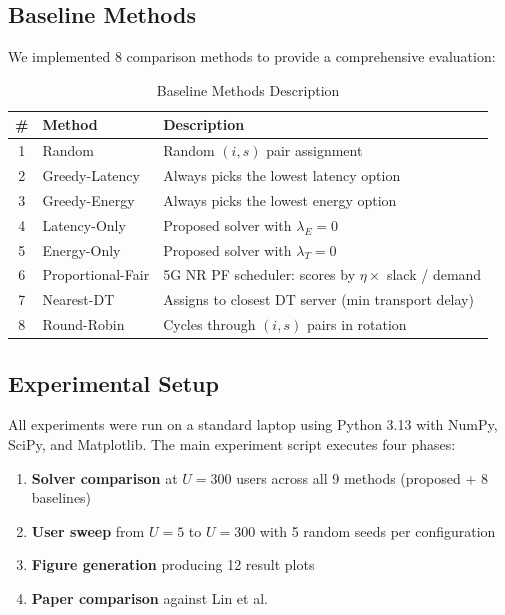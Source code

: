 \documentclass[12pt]{article}
\begin{document}
\subsection{Baseline Methods}

We implemented 8 comparison methods to provide a comprehensive evaluation:

\begin{table}[H]
\centering
\caption{Baseline Methods Description}
\label{tab:baselines}
\begin{tabular}{clp{8cm}}
\toprule
\textbf{\#} & \textbf{Method} & \textbf{Description} \\
\midrule
1 & Random           & Random $(i, s)$ pair assignment \\
2 & Greedy-Latency   & Always picks the lowest latency option \\
3 & Greedy-Energy    & Always picks the lowest energy option \\
4 & Latency-Only     & Proposed solver with $\lambda_E = 0$ \\
5 & Energy-Only      & Proposed solver with $\lambda_T = 0$ \\
6 & Proportional-Fair & 5G NR PF scheduler: scores by $\eta \times$ slack / demand \\
7 & Nearest-DT       & Assigns to closest DT server (min transport delay) \\
8 & Round-Robin      & Cycles through $(i, s)$ pairs in rotation \\
\bottomrule
\end{tabular}
\end{table}

\subsection{Experimental Setup}

All experiments were run on a standard laptop using Python 3.13 with NumPy, SciPy, and Matplotlib. The main experiment script executes four phases:
\begin{enumerate}
    \item \textbf{Solver comparison} at $U = 300$ users across all 9 methods (proposed + 8 baselines)
    \item \textbf{User sweep} from $U = 5$ to $U = 300$ with 5 random seeds per configuration
    \item \textbf{Figure generation} producing 12 result plots
    \item \textbf{Paper comparison} against Lin et al.\ \cite{lin2023energy}
\end{enumerate}
\end{document}
